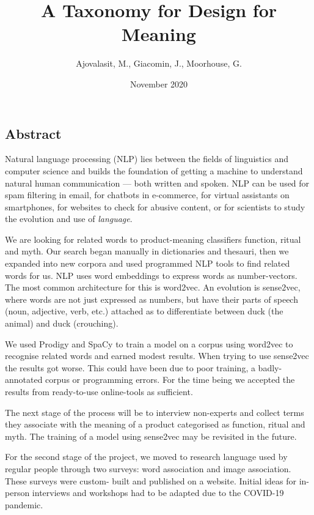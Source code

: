 \documentclass[12pt, usenames, dvipsnames]{report}
\title {A Taxonomy for Design for Meaning}
\author {Ajovalasit, M., Giacomin, J., Moorhouse, G.}
\date{November 2020}
\begin{document}
\maketitle

\begin{flushleft}

\section*{Abstract}
Natural language processing (NLP) lies between the fields of linguistics and computer science and builds the foundation of getting a machine to understand natural human communication --- both written and spoken. 
NLP can be used for spam filtering in email, for chatbots in e-commerce, for virtual assistants on smartphones, for websites to check for abusive content, or for scientists to study the evolution and use of \emph{language}.

We are looking for related words to product-meaning classifiers function, ritual and myth.
Our search began manually in dictionaries and thesauri, then we expanded into new corpora and used programmed NLP tools to find related words for us.
NLP uses word embeddings to express words as number-vectors. 
The most common architecture for this is word2vec. 
An evolution is sense2vec, where words are not just expressed as numbers, but have their parts of speech (noun, adjective, verb, etc.) attached as to differentiate between duck (the animal) and duck (crouching). 

We used Prodigy and SpaCy to train a model on a corpus using word2vec to recognise related words and earned modest results.
When trying to use sense2vec the results got worse.
This could have been due to poor training, a badly-annotated corpus or programming errors.
For the time being we accepted the results from ready-to-use online-tools as sufficient.

The next stage of the process will be to interview non-experts and collect terms they associate with the meaning of a product categorised as function, ritual and myth.
The training of a model using sense2vec may be revisited in the future.

For the second stage of the project, we moved to research language used by regular people through two surveys: word association and image association.
These surveys were custom- built and published on a website.
Initial ideas for in-person interviews and workshops had to be adapted due to the COVID-19 pandemic.


\end{flushleft}
\end{document}
